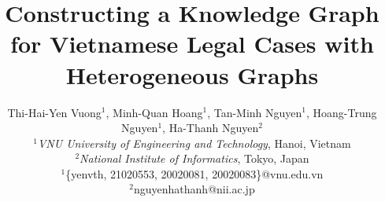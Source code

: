 \documentclass[conference]{IEEEtran}
\begin{document}
\title{Constructing a Knowledge Graph for Vietnamese Legal Cases with Heterogeneous Graphs
\\
}
\author{
Thi-Hai-Yen Vuong$^1$, Minh-Quan Hoang$^1$, Tan-Minh Nguyen$^1$, Hoang-Trung Nguyen$^1$, Ha-Thanh Nguyen$^2$ \\ 
\textit{$^1$VNU University of Engineering and Technology}, Hanoi, Vietnam \\ 
\textit{$^2$National Institute of Informatics}, Tokyo, Japan \\ 
$^1$\{yenvth, 21020553, 20020081, 20020083\}@vnu.edu.vn \\
$^2$nguyenhathanh@nii.ac.jp
}
\end{document}
